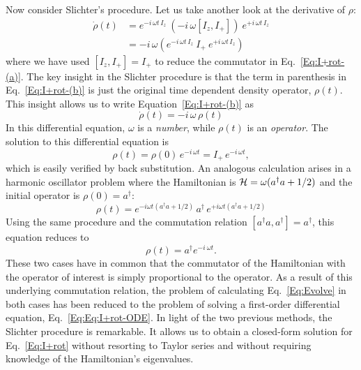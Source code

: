 Now consider Slichter's procedure. Let us take another look at the derivative of $\rho$:
\begin{subequations}  
\begin{align}
\dot{\rho}(t)
	& = e^{-i \, \omega t \, I_z} \: 
		(-i \, \omega [I_z,I_{+}] ) 
		\: e^{+i \, \omega t \, I_z} 
		\label{Eq:I+rot-(a)} \\
	& = -i \, \omega \left( 
			e^{-i \, \omega t \, I_z} \: I_{+} \: e^{+i \, \omega t \, I_z} 
		\right)
		\label{Eq:I+rot-(b)}
\end{align}
\end{subequations} 
where we have used $[I_z,I_{+}] = I_{+}$ to reduce the commutator in Eq.~\ref{Eq:I+rot-(a)}.  The key insight in the Slichter procedure is that the term in parenthesis in Eq.~\ref{Eq:I+rot-(b)} is just the original time dependent density operator, $\rho(t)$.  This insight allows us to write Equation~\ref{Eq:I+rot-(b)} as
\begin{equation}
\dot{\rho}(t) 
	= -i \, \omega \, \rho(t)
	\label{Eq:Eq:I+rot-ODE}
\end{equation}
In this differential equation, $\omega$ is a \emph{number}, while $\rho(t)$ is an \emph{operator}.  The solution to this differential equation is
\begin{equation}
\rho(t) 
	= \rho(0) \, e^{-i \, \omega t}
 	= I_{+} \, e^{-i \, \omega t},
\end{equation}
which is easily verified by back substitution. An analogous calculation arises in a harmonic oscillator problem where the Hamiltonian is ${\cal H} = \omega (a^{\dagger} a + 1/2)$ and the initial operator is $\rho(0) = a^{\dagger}$: 
\begin{equation}
\rho(t) 
	= e^{-i \omega t (a^{\dagger} a + 1/2)} 
		\, a^{\dagger} 
		\, e^{+i \omega t (a^{\dagger} a + 1/2)}
\end{equation}
Using the same procedure and the commutation relation $[a^{\dagger} a,a^{\dagger}] = a^{\dagger}$, this equation reduces to 
\begin{equation}
	\rho(t)  = a^{\dagger} e^{-i \: \omega t}.
\end{equation}
These two cases have in common that the commutator of the Hamiltonian with the operator of interest is simply proportional to the operator. As a result of this underlying commutation relation, the problem of calculating Eq.~\ref{Eq:Evolve} in both cases has been reduced to the problem of solving a first-order differential equation, Eq.~\ref{Eq:Eq:I+rot-ODE}.  In light of the two previous methods, the Slichter procedure is remarkable.  It allows us to obtain a closed-form solution for Eq.~\ref{Eq:I+rot} without resorting to Taylor series and without requiring knowledge of the Hamiltonian's eigenvalues.    

